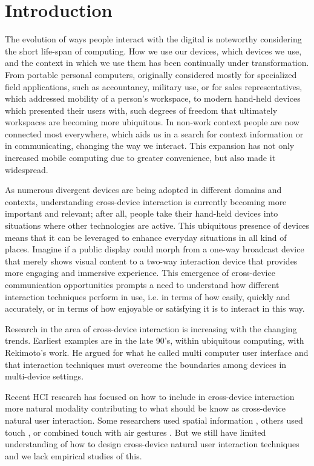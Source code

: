 \section{Introduction} \label{sec:introduction}
The evolution of ways people interact with the digital is noteworthy considering the short life-span of computing. How we use our devices, which devices we use, and the context in which we use them has been continually under transformation. From portable personal computers, originally considered mostly for specialized field applications, such as accountancy, military use, or for sales representatives, which addressed mobility of a person's workspace, to modern hand-held devices which presented their users with, such degrees of freedom that ultimately workspaces are becoming more ubiquitous. In non-work context people are now connected most everywhere, which aids us in a search for context information or in communicating, changing the way we interact. This expansion has not only increased mobile computing due to greater convenience, but also made it widespread.\cite{Francis:1997} 

As numerous divergent devices are being adopted in different domains and contexts, understanding cross-device interaction is currently becoming more important and relevant; after all, people take their hand-held devices into situations where other technologies are active. This ubiquitous presence of devices means that it can be leveraged to enhance everyday situations in all kind of places. Imagine if a public display could morph from a one-way broadcast device that merely shows visual content to a two-way interaction device that provides more engaging and immersive experience. This emergence of cross-device communication opportunities prompts a need to understand how different interaction techniques perform in use, i.e. in terms of how easily, quickly and accurately, or in terms of how enjoyable or satisfying it is to interact in this way.

Research in the area of cross-device interaction is increasing with the changing trends. Earliest examples are in the late 90's, within ubiquitous computing, with Rekimoto's work.  He argued for what he called multi computer user interface and that interaction techniques must overcome the boundaries among devices in multi-device settings\cite{Rekimoto:1998}.

Recent HCI research has focused on how to include in cross-device interaction more natural modality contributing to what should be know as cross-device natural user interaction.  Some researchers used spatial information \cite{Marquardt:2011, Marquardt:2012}, others used touch \cite{Seifert:2012}, or combined touch with air gestures \cite{Bragdon:2011} . But we still have limited understanding of how to design cross-device natural user interaction techniques and we lack empirical studies of this.

